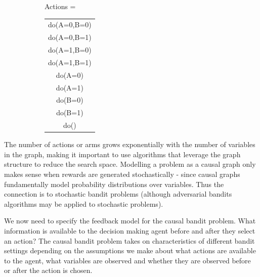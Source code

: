 \documentclass[11pt,a4paper,oneside]{book}
\theoremstyle{plain}
\theoremstyle{definition}
\begin{document}
\begin{figure}[h]
\caption{A simple causal graphical model and corresponding complete action space. A and B represent binary variables that can be intervened on and Y represents the reward.}
\label{fig:unify_frameworks}
\centering
\begin{subfigure}[c]{0.3\textwidth}
\end{subfigure}
\begin{subfigure}[t]{0.4\textwidth}
Actions = \begin{tabular}{|c|}
	\hline
  do(A=0,B=0) \\
  do(A=0,B=1) \\
  do(A=1,B=0) \\
  do(A=1,B=1) \\
  \hline
  do(A=0) \\
  do(A=1) \\
  do(B=0) \\
  do(B=1) \\
  do() \\
  \hline
\end{tabular}
\end{subfigure}
\end{figure} 

The number of actions or arms grows exponentially with the number of variables in the graph,
making it important to use algorithms that leverage the graph structure to reduce the
search space. Modelling a problem as a causal graph only makes sense when rewards are generated stochastically - since causal graphs fundamentally model probability distributions over variables. Thus the connection is to stochastic bandit problems (although adversarial bandits algorithms may be applied to stochastic problems).

We now need to specify the feedback model for the causal bandit problem. What information is available to the decision making agent before and after they select an action? The causal bandit problem takes on characteristics of different bandit settings depending on the assumptions we make about what actions are available to the agent, what variables are observed and whether they are observed before or after the action is chosen. 
\end{document}
